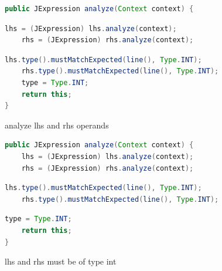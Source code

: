 \documentclass[8pt,a4paper,compress]{beamer}
\begin{document}
\begin{frame}[fragile]
\begin{overprint}
\begin{tcolorbox}[enhanced,drop shadow southwest,sharp corners,size=fbox,colback=white,fontlower=\small\ttfamily,collower=silver900]
\begin{lstlisting}[language=Java,style=focusout]
public JExpression analyze(Context context) {
\end{lstlisting}
\begin{lstlisting}[language=Java,style=focusin,backgroundcolor=\color{lime100}]
    lhs = (JExpression) lhs.analyze(context);
    rhs = (JExpression) rhs.analyze(context);
\end{lstlisting}
\begin{lstlisting}[language=Java,style=focusout]
    lhs.type().mustMatchExpected(line(), Type.INT);
    rhs.type().mustMatchExpected(line(), Type.INT);
    type = Type.INT;
    return this;
}
\end{lstlisting}

\tcblower
\begin{minipage}[t][.25cm][t]{\textwidth}
analyze lhs and rhs operands
\end{minipage}
\end{tcolorbox}

\begin{tcolorbox}[enhanced,drop shadow southwest,sharp corners,size=fbox,colback=white,fontlower=\small\ttfamily,collower=silver900]

\begin{lstlisting}[language=Java,style=focusout]
public JExpression analyze(Context context) {
    lhs = (JExpression) lhs.analyze(context);
    rhs = (JExpression) rhs.analyze(context);
\end{lstlisting}
\begin{lstlisting}[language=Java,style=focusin,backgroundcolor=\color{lime100}]
    lhs.type().mustMatchExpected(line(), Type.INT);
    rhs.type().mustMatchExpected(line(), Type.INT);
\end{lstlisting}
\begin{lstlisting}[language=Java,style=focusout]
    type = Type.INT;
    return this;
}
\end{lstlisting}

\tcblower
\begin{minipage}[t][.25cm][t]{\textwidth}
lhs and rhs must be of type int
\end{minipage}
\end{tcolorbox}

\begin{tcolorbox}[enhanced,drop shadow southwest,sharp corners,size=fbox,colback=white,fontlower=\small\ttfamily,collower=silver900]


\end{tcolorbox}
\end{overprint}
\end{frame}
\end{document}
